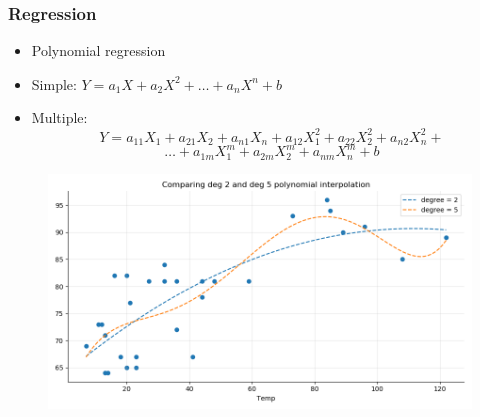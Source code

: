 \begin{frame}\frametitle{Regression}
   \begin{itemize}
      \item Polynomial regression
      \item Simple: $Y = a_1X + a_2X^2 + \dots + a_nX^n +b$
      \item Multiple: $$Y = a_{11}X_1 + a_{21}X_2 + a_{n1}X_n + a_{12}X_1^2 + a_{22}X_2^2 + a_{n2}X_n^2 + $$
                           $$\dots + a_{1m}X_1^m + a_{2m}X_2^m + a_{nm}X_n^m + b$$
   \end{itemize}
   \begin{figure}[H]
      \includegraphics[scale=.35]{../images/illustrations/model_polynomial_regression.png}
   \end{figure}
\end{frame}


